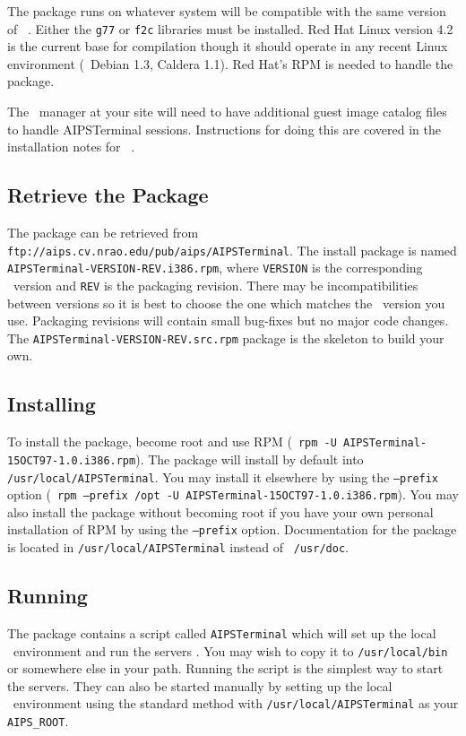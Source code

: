 The package runs on whatever system will be compatible with the same
version of \AIPS\ .  Either the {\tt g77} or {\tt f2c} libraries must be
installed.  Red Hat Linux version 4.2 is the current base for
compilation though it should operate in any recent Linux environment
(\ie\ Debian 1.3, Caldera 1.1).  Red Hat's RPM is needed to handle the
package.

The \AIPS\ manager at your site will need to have additional guest image
catalog files to handle AIPSTerminal sessions.  Instructions for doing
this are covered in the installation notes for \AIPS\ .

\subsection{Retrieve the Package}

The package can be retrieved from {\tt ftp://aips.cv.nrao.edu/pub/aips/AIPSTerminal}.  The install package is
named {\tt AIPSTerminal-VERSION-REV.i386.rpm}, where {\tt VERSION} is
the corresponding \AIPS\ version and {\tt REV} is the packaging
revision.  There may be incompatibilities between versions so it is best
to choose the one which matches the \AIPS\ version you use.  Packaging
revisions will contain small bug-fixes but no major code changes.  The
{\tt AIPSTerminal-VERSION-REV.src.rpm} package is the skeleton to build
your own.

\subsection{Installing}

To install the package, become root and use RPM (\ie\ {\tt rpm -U
AIPSTerminal-15OCT97-1.0.i386.rpm}).  The package will install by
default into {\tt /usr/local/AIPSTerminal}.  You may install it
elsewhere by using the {\tt --prefix} option (\ie\ {\tt rpm --prefix
/opt -U AIPSTerminal-15OCT97-1.0.i386.rpm}).  You may also install the
package without becoming root if you have your own personal installation
of RPM by using the {\tt --prefix} option.  Documentation for the
package is located in {\tt /usr/local/AIPSTerminal} instead of {\tt
/usr/doc}.

\subsection{Running}

The package contains a script called {\tt AIPSTerminal} which will set
up the local \AIPS\ environment and run the servers .  You may wish to
copy it to {\tt /usr/local/bin} or somewhere else in your path.  Running
the script is the simplest way to start the servers.  They can also be
started manually by setting up the local \AIPS\ environment using the
standard method with {\tt /usr/local/AIPSTerminal} as your {\tt
AIPS\_ROOT}.

